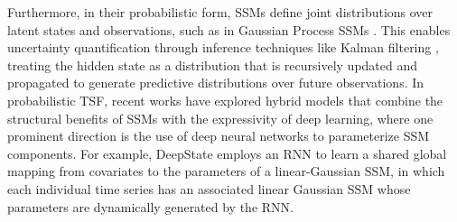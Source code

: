 \documentclass[a4paper,oneside,bibliography=totoc]{scrbook}
\begin{document}
Furthermore, in their probabilistic form, SSMs define joint distributions over latent states and observations, such as in Gaussian Process SSMs \cite{ko_learning_2011, deisenroth_robust_2012}. This enables uncertainty quantification through inference techniques like Kalman filtering \cite{kalman_new_1960}, treating the hidden state as a distribution that is recursively updated and propagated to generate predictive distributions over future observations.
In probabilistic TSF, recent works have explored hybrid models that combine the structural benefits of SSMs with the expressivity of deep learning, where one prominent direction is the use of deep neural networks to parameterize SSM components. 
For example, DeepState \cite{rangapuram_deep_2018} employs an RNN to learn a shared global mapping from covariates to the parameters of a linear-Gaussian SSM, in which each individual time series has an associated linear Gaussian SSM whose parameters are dynamically generated by the RNN.
\end{document}
